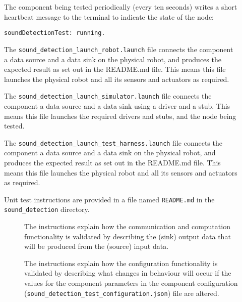 \documentclass{CSSRforAfrica}
\newcommand{\checkboxChecked}{\fbox{\ding{51}}} %
\newcommand{\checkboxDashed}{\fbox{--}}         %
\begin{document}
\begin{description}
\item[\checkboxChecked]   The component being tested periodically (every ten seconds) writes a short heartbeat message to the terminal to indicate the state of the node:
{\small 
\begin{verbatim}
soundDetectionTest: running.
\end{verbatim}}

\item[\checkboxChecked] The {\small \verb+sound_detection_launch_robot.launch+} file connects the component a data source and a data sink on the physical robot, and produces the expected result as set out in the README.md file. This means this file launches the physical robot and all its sensors and actuators as required.

\item[\checkboxDashed]   The {\small \verb+sound_detection_launch_simulator.launch+} file connects the component a data source and a data sink using a driver and a stub. This means this file launches the required drivers and stubs, and the node being tested.

\item[\checkboxChecked]   The {\small \verb+sound_detection_launch_test_harness.launch+} file connects the component a data source and a data sink on the physical robot, and produces the expected result as set out in the README.md file. This means this file launches the physical robot and all its sensors and actuators as required.

\item[\checkboxChecked] Unit test instructions are provided in a file named {\small \verb+README.md+} in the  {\small \verb+sound_detection+} directory. 


\begin{description}

\item[\checkboxChecked] The instructions explain how the communication and computation functionality is validated by describing the (sink) output data that will be produced from the (source) input data.  

\item[\checkboxChecked] The instructions explain how the configuration functionality is validated by describing what changes in behaviour will occur if the values for the component parameters in the component configuration ({\small \verb+sound_detection_test_configuration.json+}) file are altered.

\end{description}

\end{description} 
\end{document}
